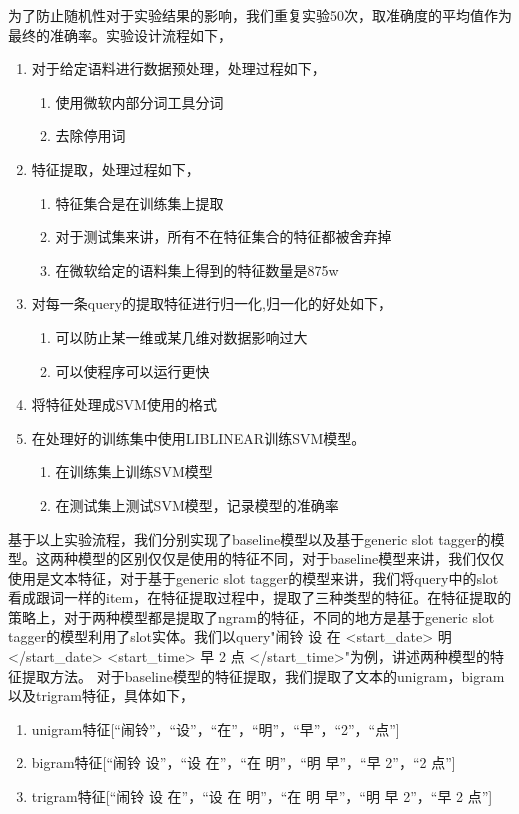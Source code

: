 \documentclass[master]{njuthesis}
\begin{document}
\begin{enumerate}
     为了防止随机性对于实验结果的影响，我们重复实验50次，取准确度的平均值作为最终的准确率。实验设计流程如下，
\begin{enumerate}
  \item 对于给定语料进行数据预处理，处理过程如下，
    \begin{enumerate}
      \item 使用微软内部分词工具分词
      \item 去除停用词
    \end{enumerate}
  \item 特征提取，处理过程如下，
    \begin{enumerate}
      \item 特征集合是在训练集上提取
      \item 对于测试集来讲，所有不在特征集合的特征都被舍弃掉
      \item 在微软给定的语料集上得到的特征数量是875w
    \end{enumerate}
  \item 对每一条query的提取特征进行归一化,归一化的好处如下，
    \begin{enumerate}
      \item 可以防止某一维或某几维对数据影响过大
      \item 可以使程序可以运行更快
    \end{enumerate}
  \item 将特征处理成SVM使用的格式
  \item 在处理好的训练集中使用LIBLINEAR训练SVM模型。
    \begin{enumerate}
      \item 在训练集上训练SVM模型
      \item 在测试集上测试SVM模型，记录模型的准确率
    \end{enumerate}
\end{enumerate}
    
    基于以上实验流程，我们分别实现了baseline模型以及基于generic slot tagger的模型。这两种模型的区别仅仅是使用的特征不同，对于baseline模型来讲，我们仅仅使用是文本特征，对于基于generic slot tagger的模型来讲，我们将query中的slot看成跟词一样的item，在特征提取过程中，提取了三种类型的特征。在特征提取的策略上，对于两种模型都是提取了ngram的特征，不同的地方是基于generic slot tagger的模型利用了slot实体。我们以query"闹铃 设 在 <start\_date> 明 </start\_date> <start\_time> 早 2 点 </start\_time>"为例，讲述两种模型的特征提取方法。
    对于baseline模型的特征提取，我们提取了文本的unigram，bigram以及trigram特征，具体如下，
    \begin{enumerate}
      \item unigram特征[“闹铃”，“设”，“在”，“明”，“早”，“2”，“点”]
      \item bigram特征[“闹铃 设”，“设 在”，“在 明”，“明 早”，“早 2”，“2 点”]
      \item trigram特征[“闹铃 设 在”，“设 在 明”，“在 明 早”，“明 早 2”，“早 2 点”]
    \end{enumerate}


\end{enumerate}
\end{document}
